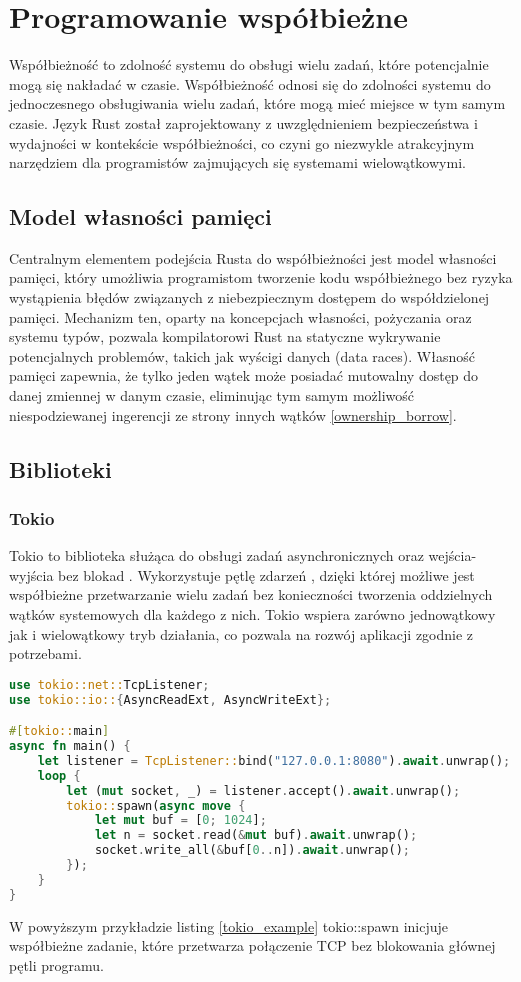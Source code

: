 \section{Programowanie współbieżne}
Współbieżność to zdolność systemu do obsługi wielu zadań, które potencjalnie mogą się nakładać w czasie. Współbieżność odnosi się do zdolności systemu do jednoczesnego obsługiwania wielu zadań, które mogą mieć miejsce w tym samym czasie. Język Rust został zaprojektowany z uwzględnieniem bezpieczeństwa i wydajności w kontekście współbieżności, co czyni go niezwykle atrakcyjnym narzędziem dla programistów zajmujących się systemami wielowątkowymi.

\subsection{Model własności pamięci}
Centralnym elementem podejścia Rusta do współbieżności jest model własności pamięci, który umożliwia programistom tworzenie kodu współbieżnego bez ryzyka wystąpienia błędów związanych z niebezpiecznym dostępem do współdzielonej pamięci. Mechanizm ten, oparty na koncepcjach własności, pożyczania oraz systemu typów, pozwala kompilatorowi Rust na statyczne wykrywanie potencjalnych problemów, takich jak wyścigi danych (data races). Własność pamięci zapewnia, że tylko jeden wątek może posiadać mutowalny dostęp do danej zmiennej w danym czasie, eliminując tym samym możliwość niespodziewanej ingerencji ze strony innych wątków \ref{ownership_borrow}.

\subsection{Biblioteki}
\subsubsection{Tokio}
Tokio to biblioteka służąca do obsługi zadań asynchronicznych oraz wejścia-wyjścia bez blokad . Wykorzystuje pętlę zdarzeń , dzięki której możliwe jest współbieżne przetwarzanie wielu zadań bez konieczności tworzenia oddzielnych wątków systemowych dla każdego z nich. Tokio wspiera zarówno jednowątkowy jak i wielowątkowy tryb działania, co pozwala na rozwój aplikacji zgodnie z potrzebami.

\begin{lstlisting}[language=Rust, caption=Przykład użycia Tokio, label=tokio_example]
use tokio::net::TcpListener;
use tokio::io::{AsyncReadExt, AsyncWriteExt};

#[tokio::main]
async fn main() {
    let listener = TcpListener::bind("127.0.0.1:8080").await.unwrap();
    loop {
        let (mut socket, _) = listener.accept().await.unwrap();
        tokio::spawn(async move {
            let mut buf = [0; 1024];
            let n = socket.read(&mut buf).await.unwrap();
            socket.write_all(&buf[0..n]).await.unwrap();
        });
    }
}
\end{lstlisting}
W powyższym przykładzie listing \ref{tokio_example} tokio::spawn inicjuje współbieżne zadanie, które przetwarza połączenie TCP bez blokowania głównej pętli programu.

